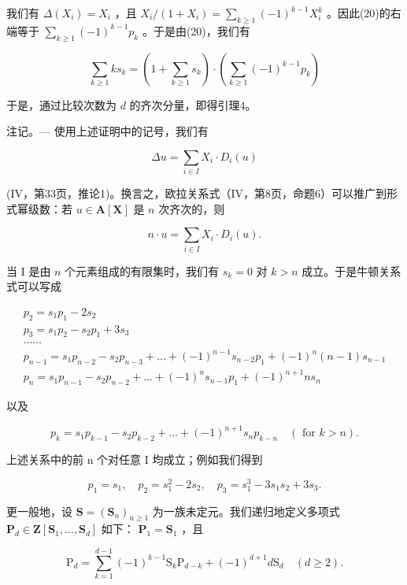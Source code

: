 我们有 \(\Delta(X_i) = X_i\) ，且 \(X_i / (1 + X_i) = \sum_{k \geq 1} (-1)^{k-1} X_i^k\) 。因此(20)的右端等于 \(\sum_{k \geq 1} (-1)^{k-1} p_k\) 。于是由(20)，我们有

\[
\sum_ {k \geqslant 1} k s _ {k} = \left(1 + \sum_ {k \geqslant 1} s _ {k}\right) \cdot \left(\sum_ {k \geqslant 1} (- 1) ^ {k - 1} p _ {k}\right)
\]

于是，通过比较次数为 \(d\) 的齐次分量，即得引理4。

注记。--- 使用上述证明中的记号，我们有

\[
\Delta u = \sum_ {i \in I} X _ {i} \cdot D _ {i} (u)
\]

(IV，第33页，推论1)。换言之，欧拉关系式（IV，第8页，命题6）可以推广到形式幂级数：若 \(u \in \mathbf{A}[\mathbf{X}]\) 是 \(n\) 次齐次的，则

\[
n \cdot u = \sum_ {i \in I} X _ {i} \cdot D _ {i} (u).\tag{21}
\]

当 I 是由 \(n\) 个元素组成的有限集时，我们有 \(s_k = 0\) 对 \(k > n\) 成立。于是牛顿关系式可以写成

\[
\begin{array}{l} p _ {2} = s _ {1} p _ {1} - 2 s _ {2} \\ p _ {3} = s _ {1} p _ {2} - s _ {2} p _ {1} + 3 s _ {3} \\ \dots \dots \\ p _ {n - 1} = s _ {1} p _ {n - 2} - s _ {2} p _ {n - 3} + \dots + (- 1) ^ {n - 1} s _ {n - 2} p _ {1} + (- 1) ^ {n} (n - 1) s _ {n - 1} \\ p _ {n} = s _ {1} p _ {n - 1} - s _ {2} p _ {n - 2} + \dots + (- 1) ^ {n} s _ {n - 1} p _ {1} + (- 1) ^ {n + 1} n s _ {n} \end{array}
\]

以及

\[
p _ {k} = s _ {1} p _ {k - 1} - s _ {2} p _ {k - 2} + \dots + (- 1) ^ {n + 1} s _ {n} p _ {k - n} \quad (\text { for } k > n).\tag{22}
\]

上述关系中的前 n 个对任意 I 均成立；例如我们得到

\[
p _ {1} = s _ {1}, \quad p _ {2} = s _ {1} ^ {2} - 2 s _ {2}, \quad p _ {3} = s _ {1} ^ {3} - 3 s _ {1} s _ {2} + 3 s _ {3}.
\]

更一般地，设 \(\mathbf{S} = (\mathbf{S}_n)_{n\geqslant 1}\) 为一族未定元。我们递归地定义多项式 \(\mathbf{P}_d\in \mathbf{Z}[\mathbf{S}_1,\dots ,\mathbf{S}_d]\) 如下： \(\mathbf{P}_1 = \mathbf{S}_1\) ，且

\[
\mathrm{P} _ {d} = \sum_ {k = 1} ^ {d - 1} (- 1) ^ {k - 1} \mathrm{S} _ {k} \mathrm{P} _ {d - k} + (- 1) ^ {d + 1} d \mathrm{S} _ {d} \quad (d \geqslant 2).
\]


